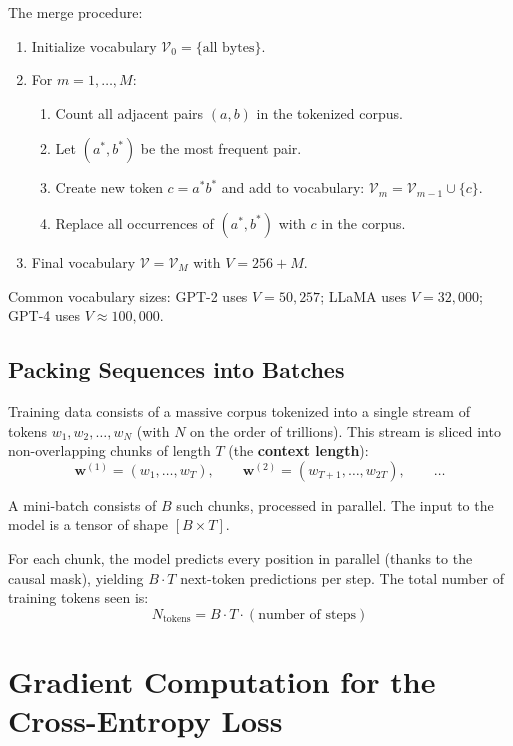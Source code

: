 \documentclass[main.tex]{subfiles}
\begin{document}
The merge procedure:
\begin{enumerate}
    \item Initialize vocabulary $\mathcal{V}_0 = \{\text{all bytes}\}$.
    \item For $m = 1, \ldots, M$:
    \begin{enumerate}
        \item Count all adjacent pairs $(a, b)$ in the tokenized corpus.
        \item Let $(a^*, b^*)$ be the most frequent pair.
        \item Create new token $c = a^*b^*$ and add to vocabulary: $\mathcal{V}_m = \mathcal{V}_{m-1} \cup \{c\}$.
        \item Replace all occurrences of $(a^*, b^*)$ with $c$ in the corpus.
    \end{enumerate}
    \item Final vocabulary $\mathcal{V} = \mathcal{V}_M$ with $V = 256 + M$.
\end{enumerate}

Common vocabulary sizes: GPT-2 uses $V = 50{,}257$; LLaMA uses $V = 32{,}000$; GPT-4 uses $V \approx 100{,}000$.

\subsection{Packing Sequences into Batches}

Training data consists of a massive corpus tokenized into a single stream of tokens $w_1, w_2, \ldots, w_N$ (with $N$ on the order of trillions). This stream is sliced into non-overlapping chunks of length $T$ (the \textbf{context length}):
$$\mathbf{w}^{(1)} = (w_1, \ldots, w_T), \qquad \mathbf{w}^{(2)} = (w_{T+1}, \ldots, w_{2T}), \qquad \ldots$$

A mini-batch consists of $B$ such chunks, processed in parallel. The input to the model is a tensor of shape $[B \times T]$.

For each chunk, the model predicts every position in parallel (thanks to the causal mask), yielding $B \cdot T$ next-token predictions per step. The total number of training tokens seen is:
$$N_{\text{tokens}} = B \cdot T \cdot (\text{number of steps})$$

\needspace{0.33\textheight}
\section{Gradient Computation for the Cross-Entropy Loss}
\end{document}
